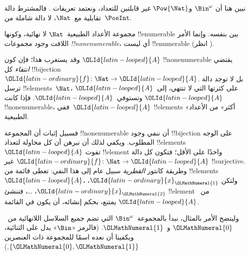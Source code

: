 \documentclass[../../../include/open-logic-section]{subfiles}
\begin{document}


\begin{editorial}
نبين هنا أن $\Bin^\omega$ و$\Pow{\Nat}$ غير قابلتين للتعداد، ونعتمد تعريفات . فالمشترط دالة تقابلية مع~$\Nat$، لا دالة شاملة من~$\PosInt$.
\end{editorial}

\begin{explain}
مجموعة الأعداد الطبيعية~$\Nat$ لا نهائية، وكونها !!{enumerable} بين بنفسه. وإنما الأمر اللافت وجود مجموعات \emph{!!{nonenumerable}}، أي ليست !!{enumerable} (انظر ).

وقد يستغرب هذا؛ فإن كون $\OLId{latin-looped}{A}$ !!{nonenumerable} يقتضي \emph{انتفاء} كل !!{bijection} $\OLId{latin-ordinary}{f}
\colon \Nat \to \OLId{latin-looped}{A}$. بل لا توجد دالة ترسل !!{element}s~$\Nat$، على كثرتها التي لا تنتهي، إلى~$\OLId{latin-looped}{A}$ وتستوفي~$\OLId{latin-looped}{A}$. فإذا كانت $\OLId{latin-looped}{A}$ !!{nonenumerable}، ففي~$\OLId{latin-looped}{A}$ !!{element}s «أكثر» من الأعداد الطبيعية.

فسبيل إثبات أن المجموعة !!{nonenumerable} أن ننفي وجود !!{bijection} على الوجه المطلوب. ويكفي لذلك أن نبرهن أن كل محاولة لتعداد !!{element}s~$\OLId{latin-looped}{A}$ تفوت !!{element} واحدًا على الأقل؛ فتكون كل دالة $\OLId{latin-ordinary}{f}\colon \Nat \to \OLId{latin-looped}{A}$ غير !!{surjective}. وطريقة كانتور \emph{القطرية} سبيل عام إلى هذا النفي: تعطى قائمة من !!{element}s~$\OLId{latin-looped}{A}$، ولتكن $\OLId{latin-ordinary}{x}_\OLMathNumeral{1}$، $\OLId{latin-ordinary}{x}_\OLMathNumeral{2}$، \dots، فننشئ !!{element} من~$\OLId{latin-looped}{A}$ يمتنع، بحكم إنشائه، أن يكون في القائمة.

وليتضح الأمر بالمثال، نبدأ بالمجموعة~$\Bin^\omega$ التي تضم جميع السلاسل اللانهائية من~$\OLMathNumeral{0}$ و~$\OLMathNumeral{1}$. (فالرمز «$\Bin$» يدل على الثنائية، ويكفينا أن نعده اسمًا للمجموعة ذات العنصرين $\{\OLMathNumeral{0},\OLMathNumeral{1}\}$.)
\end{explain}
\end{document}
